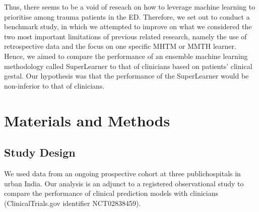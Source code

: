 \documentclass[10pt,letterpaper]{article}\usepackage[]{graphicx}\usepackage[]{color}
\begin{document}
Thus, there seems to be a void of reseach on how to leverage machine learning to
prioritise among trauma patients in the ED. Therefore, we set out to conduct a
benchmark study, in which we attempted to improve on what we considered the two
most important limitations of previous related research, namely the use of
retrospective data and the focus on one specific MHTM or MMTH learner. Hence, we
aimed to compare the performance of an ensemble machine learning methodology
called SuperLearner to that of clinicians based on patients' clinical
gestal. Our hypothesis was that the performance of the SuperLearner would be
non-inferior to that of clinicians.


\section*{Materials and Methods}
\subsection*{Study Design}
We used data from an ongoing prospective cohort at three publichospitals in
urban India. Our analysis is an adjunct to a registered observational study to
compare the performance of clinical prediction models with clinicians
(ClinicalTrials.gov identifier NCT02838459).

\end{document}
